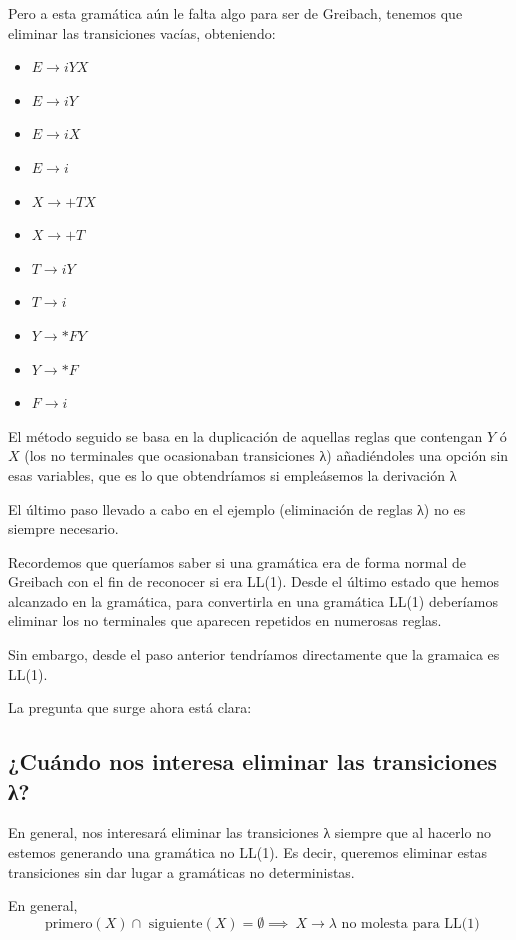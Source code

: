 \documentclass{apuntes}
\begin{document}
\begin{example}
Pero a esta gramática aún le falta algo para ser de Greibach, tenemos que eliminar las transiciones vacías, obteniendo:
\begin{itemize}
\item $E \rightarrow iYX$
\item $E \rightarrow iY$
\item $E \rightarrow iX$
\item $E \rightarrow i$
\item $X \rightarrow +TX$
\item $X \rightarrow +T$
\item $T \rightarrow iY$
\item $T \rightarrow i$
\item $Y \rightarrow *FY$
\item $Y \rightarrow *F$
\item $F \rightarrow i$
\end{itemize}
El método seguido se basa en la duplicación de aquellas reglas que contengan $Y$ ó $X$ (los no terminales que ocasionaban transiciones λ) añadiéndoles una opción sin esas variables, que es lo que obtendríamos si empleásemos la derivación λ
\end{example}

El último paso llevado a cabo en el ejemplo (eliminación de reglas λ) no es siempre necesario.

Recordemos que queríamos saber si una gramática era de forma normal de Greibach con el fin de reconocer si era LL(1). Desde el último estado que hemos alcanzado en la gramática, para convertirla en una gramática LL(1) deberíamos eliminar los no terminales que aparecen repetidos en numerosas reglas.

Sin embargo, desde el paso anterior tendríamos directamente que la gramaica es LL(1).

La pregunta que surge ahora está clara:

\subsection{¿Cuándo nos interesa eliminar las transiciones λ?}
En general, nos interesará eliminar las transiciones λ siempre que al hacerlo no estemos generando una gramática no LL(1). Es decir, queremos eliminar estas transiciones sin dar lugar a gramáticas no deterministas.

En general,
\[\text{ primero}(X) \cap \text{ siguiente}(X) = \emptyset \implies \ X \rightarrow λ\text{ no molesta para LL(1)}\]
\end{document}
